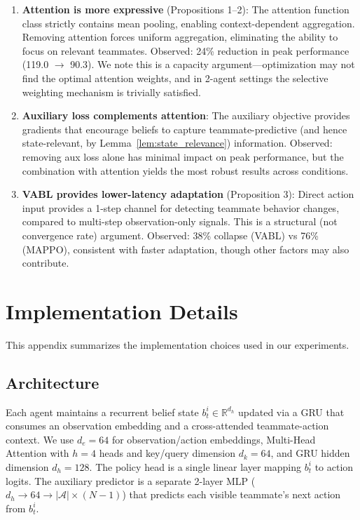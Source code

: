 \documentclass{article}
\theoremstyle{plain}
\theoremstyle{definition}
\theoremstyle{remark}
\begin{document}
\begin{enumerate}
\item \textbf{Attention is more expressive} (Propositions 1--2): The attention function class strictly contains mean pooling, enabling context-dependent aggregation. Removing attention forces uniform aggregation, eliminating the ability to focus on relevant teammates. Observed: 24\% reduction in peak performance (119.0 $\to$ 90.3). We note this is a capacity argument---optimization may not find the optimal attention weights, and in 2-agent settings the selective weighting mechanism is trivially satisfied.

\item \textbf{Auxiliary loss complements attention}: The auxiliary objective provides gradients that encourage beliefs to capture teammate-predictive (and hence state-relevant, by Lemma~\ref{lem:state_relevance}) information. Observed: removing aux loss alone has minimal impact on peak performance, but the combination with attention yields the most robust results across conditions.

\item \textbf{VABL provides lower-latency adaptation} (Proposition 3): Direct action input provides a 1-step channel for detecting teammate behavior changes, compared to multi-step observation-only signals. This is a structural (not convergence rate) argument. Observed: 38\% collapse (VABL) vs 76\% (MAPPO), consistent with faster adaptation, though other factors may also contribute.
\end{enumerate}

\section{Implementation Details}
\label{app:implementation}

This appendix summarizes the implementation choices used in our experiments.

\subsection{Architecture}
Each agent maintains a recurrent belief state $b_t^i \in \mathbb{R}^{d_h}$ updated via a GRU that consumes an observation embedding and a cross-attended teammate-action context. We use $d_e{=}64$ for observation/action embeddings, Multi-Head Attention with $h{=}4$ heads and key/query dimension $d_k{=}64$, and GRU hidden dimension $d_h{=}128$. The policy head is a single linear layer mapping $b_t^i$ to action logits. The auxiliary predictor is a separate 2-layer MLP ($d_h \to 64 \to |\mathcal{A}| \times (N-1)$) that predicts each visible teammate's next action from $b_t^i$.
\end{document}
